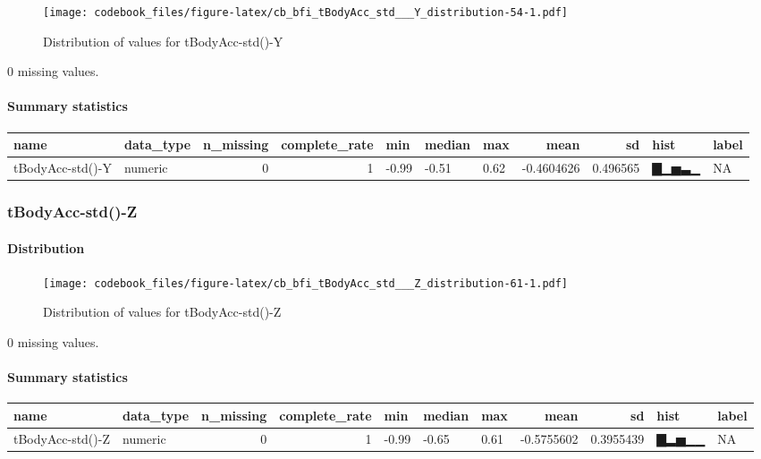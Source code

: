 \documentclass[
]{article}
\begin{document}
\begin{figure}
\centering
\texttt{[image: codebook\_files/figure-latex/cb\_bfi\_tBodyAcc\_std\_\_\_Y\_distribution-54-1.pdf]}
\caption{Distribution of values for tBodyAcc-std()-Y}
\end{figure}

0 missing values.

\hypertarget{tBodyAcc_std___Y_summary}{%
\paragraph{Summary statistics}\label{tBodyAcc_std___Y_summary}}

\begin{longtable}[]{@{}llrrlllrrll@{}}
\toprule
name & data\_type & n\_missing & complete\_rate & min & median & max &
mean & sd & hist & label \\
\midrule
\endhead
tBodyAcc-std()-Y & numeric & 0 & 1 & -0.99 & -0.51 & 0.62 & -0.4604626 &
0.496565 & ▇▁▅▃▁ & NA \\
\bottomrule
\end{longtable}

\hypertarget{tBodyAcc_std___Z}{%
\subsubsection{tBodyAcc-std()-Z}\label{tBodyAcc_std___Z}}

\hypertarget{tBodyAcc_std___Z_distribution}{%
\paragraph{Distribution}\label{tBodyAcc_std___Z_distribution}}

\begin{figure}
\centering
\texttt{[image: codebook\_files/figure-latex/cb\_bfi\_tBodyAcc\_std\_\_\_Z\_distribution-61-1.pdf]}
\caption{Distribution of values for tBodyAcc-std()-Z}
\end{figure}

0 missing values.

\hypertarget{tBodyAcc_std___Z_summary}{%
\paragraph{Summary statistics}\label{tBodyAcc_std___Z_summary}}

\begin{longtable}[]{@{}llrrlllrrll@{}}
\toprule
name & data\_type & n\_missing & complete\_rate & min & median & max &
mean & sd & hist & label \\
\midrule
\endhead
tBodyAcc-std()-Z & numeric & 0 & 1 & -0.99 & -0.65 & 0.61 & -0.5755602 &
0.3955439 & ▇▂▅▁▁ & NA \\
\bottomrule
\end{longtable}
\end{document}
